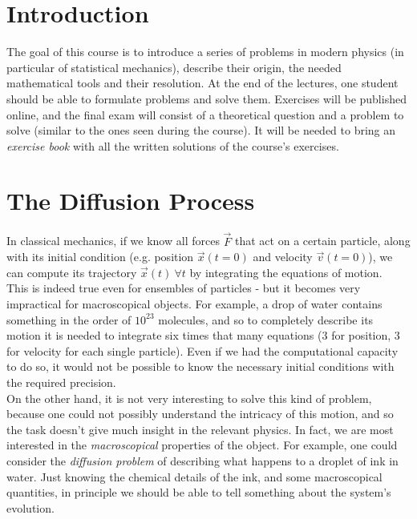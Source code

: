 \documentclass[../template.tex]{subfiles}
\begin{document}
\section{Introduction} %
The goal of this course is to introduce a series of problems in modern physics (in particular of statistical mechanics), describe their origin, the needed mathematical tools and their resolution. At the end of the lectures, one student should be able to formulate problems and solve them. Exercises will be published online, and the final exam will consist of a theoretical question and a problem to solve (similar to the ones seen during the course). It will be needed to bring an \textit{exercise book} with all the written solutions of the course's exercises.\\


\section{The Diffusion Process}
In classical mechanics, if we know all forces $\vec{F}$ that act on a certain particle, along with its initial condition (e.g. position $\vec{x}(t=0)$ and velocity $\vec{v}(t=0)$), we can compute its trajectory $\vec{x}(t)\> \forall t$ by integrating the equations of motion.\\
This is indeed true even for ensembles of particles - but it becomes very impractical for macroscopical objects. For example, a drop of water contains something in the order of $10^{23}$ molecules, and so to completely describe its motion it is needed to integrate six times that many equations ($3$ for position, $3$ for velocity for each single particle). Even if we had the computational capacity to do so, it would not be possible to know the necessary initial conditions with the required precision.\\

On the other hand, it is not very interesting to solve this kind of problem, because one could not possibly understand the intricacy of this motion, and so the task doesn't give much insight in the relevant physics. In fact, we are most interested in the \textit{macroscopical} properties of the object. For example, one could consider the \textit{diffusion problem} of describing what happens to a droplet of ink in water. Just knowing the chemical details of the ink, and some macroscopical quantities, in principle we should be able to tell something about the system's evolution.\\
\end{document}
